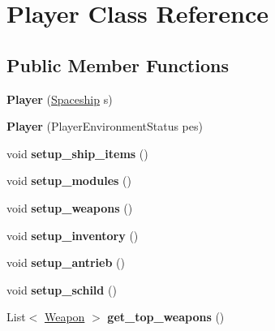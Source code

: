 \hypertarget{class_player}{}\section{Player Class Reference}
\label{class_player}
\subsection*{Public Member Functions}
\begin{DoxyCompactItemize}
\item 
\mbox{\label{class_player_a3950af30aaf1ffc852fbd79a7c6f14d5}} 
{\bfseries Player} (\hyperlink{class_spaceship}{Spaceship} s)
\item 
\mbox{\label{class_player_aa9611f905a16638dba9c1873987fe4a9}} 
{\bfseries Player} (Player\+Environment\+Status pes)
\item 
\mbox{\label{class_player_a1f3a4cb09f5c8c885caf9583194bd16e}} 
void {\bfseries setup\+\_\+ship\+\_\+items} ()
\item 
\mbox{\label{class_player_a249be50a7beb9083572a1c77b3271399}} 
void {\bfseries setup\+\_\+modules} ()
\item 
\mbox{\label{class_player_a9cddbe8840fa9a7a33ac0520765b4853}} 
void {\bfseries setup\+\_\+weapons} ()
\item 
\mbox{\label{class_player_a2ce7a482d9a6454f3278d052bcd02ef7}} 
void {\bfseries setup\+\_\+inventory} ()
\item 
\mbox{\label{class_player_a4933c82202c7a7cef04717fcede6e5d9}} 
void {\bfseries setup\+\_\+antrieb} ()
\item 
\mbox{\label{class_player_aabb5c185405b3f77747447918dec94b5}} 
void {\bfseries setup\+\_\+schild} ()
\item 
\mbox{\label{class_player_a29ccabb89925e1d4ef80e28a2b7da8e9}} 
List$<$ \hyperlink{class_weapon}{Weapon} $>$ {\bfseries get\+\_\+top\+\_\+weapons} ()
\item 
\mbox{\label{class_player_a6db9aa013dbb55802bce008b363490e0}} 

\end{DoxyCompactItemize}

